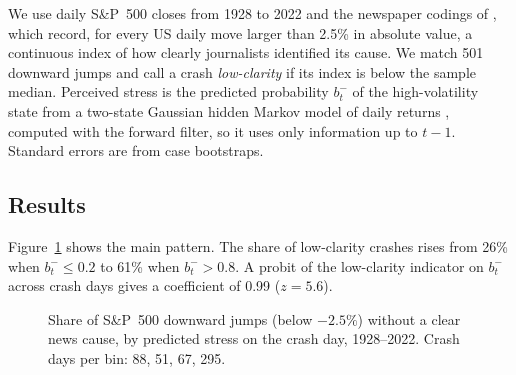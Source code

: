 \documentclass[11pt,a4paper]{article}
\begin{document}
We use daily S\&P~500 closes from 1928 to 2022 and the newspaper codings of \citet{BBDS2021},
which record, for every US daily move larger than 2.5\% in absolute value, a continuous index
of how clearly journalists identified its cause. We match 501 downward jumps and call a crash
\emph{low-clarity} if its index is below the sample median. Perceived stress is the predicted
probability $b^-_t$ of the high-volatility state from a two-state Gaussian hidden Markov model
of daily returns \citep{Hamilton1989}, computed with the forward filter, so it uses only
information up to $t-1$. Standard errors are from case bootstraps.

\subsection{Results}

Figure~\ref{fig:clarity} shows the main pattern. The share of low-clarity crashes rises from
26\% when $b^-_t\le0.2$ to 61\% when $b^-_t>0.8$. A probit of the low-clarity indicator on
$b^-_t$ across crash days gives a coefficient of 0.99 ($z=5.6$).

\begin{figure}[ht]
\centering
{}
\caption{Share of S\&P~500 downward jumps (below $-2.5\%$) without a clear news cause, by
predicted stress on the crash day, 1928--2022. Crash days per bin: 88, 51, 67, 295.}
\label{fig:clarity}
\end{figure}
\end{document}

